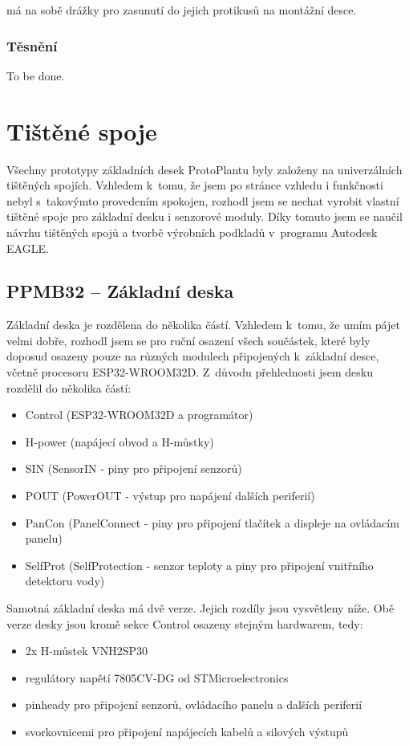 \noindent{} má na sobě drážky pro zasunutí do jejich protikusů na montážní desce.

\subsection{Těsnění}
To be done.

\chapter{Tištěné spoje}
Všechny prototypy základních desek ProtoPlantu byly založeny na univerzálních tištěných spojích. Vzhledem k~tomu, že jsem po stránce vzhledu i funkčnosti nebyl s~takovýmto provedením spokojen, rozhodl jsem se nechat vyrobit vlastní tištěné spoje pro základní desku i senzorové moduly.
Díky tomuto jsem se naučil návrhu tištěných spojů a tvorbě výrobních podkladů v~programu Autodesk EAGLE.

\section{PPMB32 -- Základní deska}
\label{subsec:motherBoard}
Základní deska je rozdělena do několika částí. 
Vzhledem k~tomu, že umím pájet velmi dobře, rozhodl jsem se pro ruční osazení všech součástek, které byly doposud osazeny pouze na různých modulech připojených k~základní desce, včetně procesoru ESP32-WROOM32D.
Z~důvodu přehlednosti jsem desku rozdělil do několika částí:

\begin{itemize}
    \item Control (ESP32-WROOM32D a programátor)
    \item H-power (napájecí obvod a H-můstky)
    \item SIN (SensorIN - piny pro připojení senzorů)
    \item POUT (PowerOUT - výstup pro napájení dalších periferií)
    \item PanCon (PanelConnect - piny pro připojení tlačítek a displeje na ovládacím panelu)
    \item SelfProt (SelfProtection - senzor teploty a piny pro připojení vnitřního detektoru vody)
\end{itemize} 

Samotná základní deska má dvě verze. Jejich rozdíly jsou vysvětleny níže.
Obě verze desky jsou kromě sekce Control osazeny stejným hardwarem, tedy:

\begin{itemize}
    \item 2x H-můstek VNH2SP30
    \item regulátory napětí 7805CV-DG od STMicroelectronics
    \item pinheady pro připojení senzorů, ovládacího panelu a dalších periferií
    \item svorkovnicemi pro připojení napájecích kabelů a silových výstupů
\end{itemize}

